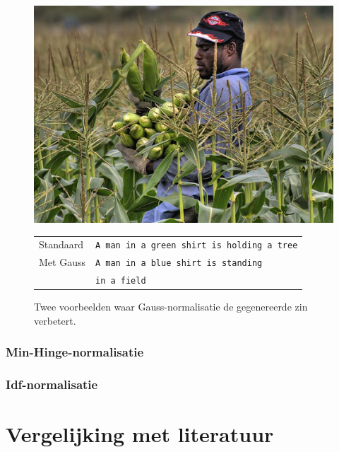 \begin{figure}
		\centering
		\begin{minipage}[t]{.3\textwidth}
			\centering
			\vspace{0pt}
			\includegraphics[width=\textwidth]{Images/Results/gauss/man}
		\end{minipage}\hfill
		\begin{minipage}[t]{.7\textwidth}
			\vspace{0pt}
			\begin{tabular}{ll}
				Standaard & \texttt{A man in a green shirt is holding a tree} \\
				Met Gauss & \texttt{A man in a blue shirt is standing }\\
				~ & \texttt{in a field} \\
			\end{tabular}
		\end{minipage}
\caption{Twee voorbeelden waar Gauss-normalisatie de gegenereerde zin verbetert.}
\end{figure}



\subsubsection{Min-Hinge-normalisatie}

\subsubsection{Idf-normalisatie}

\section{Vergelijking met literatuur} %
\label{sec:vergelijking_met_literatuur}

